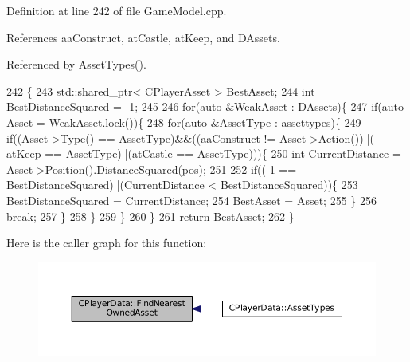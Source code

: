 Definition at line 242 of file Game\+Model.\+cpp.



References aa\+Construct, at\+Castle, at\+Keep, and D\+Assets.



Referenced by Asset\+Types().


\begin{DoxyCode}
242                                                                                                            
                       \{
243     std::shared\_ptr< CPlayerAsset > BestAsset;
244     \textcolor{keywordtype}{int} BestDistanceSquared = -1;
245 
246     \textcolor{keywordflow}{for}(\textcolor{keyword}{auto} &WeakAsset : \hyperlink{classCPlayerData_a1d7dd355facf52db6242e3554373906c}{DAssets})\{
247         \textcolor{keywordflow}{if}(\textcolor{keyword}{auto} Asset = WeakAsset.lock())\{
248             \textcolor{keywordflow}{for}(\textcolor{keyword}{auto} &AssetType : assettypes)\{
249                 \textcolor{keywordflow}{if}((Asset->Type() == AssetType)&&((\hyperlink{GameDataTypes_8h_ab47668e651a3032cfb9c40ea2d60d670a7ef6b863f66dd7dcc95a199cd758ae1d}{aaConstruct} != Asset->Action())||(
      \hyperlink{GameDataTypes_8h_a5600d4fc433b83300308921974477fecaaed39451bedb0392ad95fbc9c95bef31}{atKeep} == AssetType)||(\hyperlink{GameDataTypes_8h_a5600d4fc433b83300308921974477feca6727b47855e74f3f7b6e4a96d0c2a42a}{atCastle} == AssetType)))\{
250                     \textcolor{keywordtype}{int} CurrentDistance = Asset->Position().DistanceSquared(pos);
251                     
252                     \textcolor{keywordflow}{if}((-1 == BestDistanceSquared)||(CurrentDistance < BestDistanceSquared))\{
253                         BestDistanceSquared = CurrentDistance;
254                         BestAsset = Asset;
255                     \}
256                     \textcolor{keywordflow}{break};
257                 \}
258             \}
259         \}
260     \}
261     \textcolor{keywordflow}{return} BestAsset;
262 \}
\end{DoxyCode}
Here is the caller graph for this function\+:\nopagebreak
\begin{figure}[H]
\begin{center}
\leavevmode
\includegraphics[width=350pt]{classCPlayerData_a53c9e046c6f43fd83a0feb32b4fe999d_icgraph}
\end{center}
\end{figure}
\hypertarget{classCPlayerData_a45b5ba15a17796acdbaca7eacc7532d0}{}\label{classCPlayerData_a45b5ba15a17796acdbaca7eacc7532d0} 
